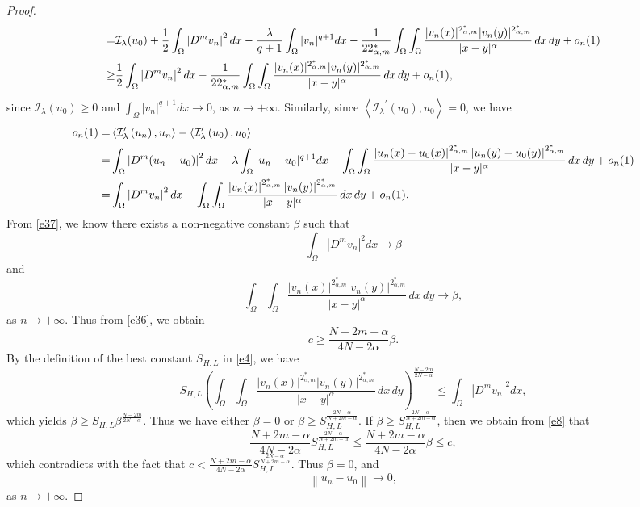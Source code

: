 \documentclass[reqno]{amsart}
\newcommand{\la} {\lambda}
\newcommand{\Om}{\Omega}
\newcommand{\al} {\alpha}
\newcommand{\mc} {\mathcal}
\numberwithin{theorem}{section} \numberwithin{equation}{section}
\begin{document}
\begin{proof}
\begin{align}
= & \mc{I}_\la(u_0)+\frac{1}{2} \int_{\Om}\left|D^m v_n\right|^2 d x-\frac{\la}{q+1} \int_{\Om} |v_n|^{q+1} d x-\frac{1}{22_{\al, m}^*} \int_{\Om} \int_{\Om} \frac{|v_n(x)|^{2_{\al, m}^*}|v_n(y)|^{2_{\al, m}^*}}{|x-y|^\al} \, dx \, dy+o_n(1)\notag \\
\geq & \frac{1}{2} \int_{\Om}\left|D^m v_n\right|^2 d x-\frac{1}{22_{\al, m}^*} \int_{\Om} \int_{\Om} \frac{|v_n(x)|^{2_{\al, m}^*}|v_n(y)|^{2_{\al, m}^*}}{|x-y|^\al} \, dx \, dy+o_n(1),
\end{align}
since $\mc{I_\la}(u_0) \geq 0$ and $\int_{\Om} |v_n|^{q+1} d x \rightarrow 0$, as $n \rightarrow + \infty$. Similarly, since $\left\langle \mc{I_\la}^{\prime}(u_0), u_0\right\rangle=0$,
we have
\begin{align}\label{e37}
o_n(1)= & \left\langle \mc{I}_\la^{\prime}\left(u_n\right), u_n\right\rangle -\left\langle \mc{I}_\la^{\prime}\left(u_0\right), u_0\right\rangle\notag\\
= &\int_{\Om}\left|D^m (u_n -u_0)\right|^2 d x-\la \int_{\Om} |u_n -u_0|^{q+1} d x-\int_{\Om} \int_{\Om} \frac{\left|u_n(x)-u_0(x)\right|^{2_{\al,m}^{*}}\left|u_n(y)-u_0(y)\right|^{2_{\al,m}^{*}}}{|x-y|^\al} \, dx \, dy+o_n(1)\notag \\
= & \int_{\Om}\left|D^m v_n\right|^2 d x-\int_{\Om} \int_{\Om} \frac{\left|v_n(x)\right|^{2_{\al,m}^{*}}\left|v_n(y)\right|^{2_{\al,m}^{*}}}{|x-y|^\al} \, dx \, dy+o_n(1).
\end{align}
From \eqref{e37}, we know there exists a non-negative constant ${\beta}$ such that
\[\int_{\Om}\left|D^m v_n\right|^2 d x \rightarrow {\beta}\]
and
\[\int_{\Om} \int_{\Om} \frac{\left|v_n(x)\right|^{2_{\al, m}^*}\left|v_n(y)\right|^{2_{\al, m}^*}}{|x-y|^\al} \, dx \, dy \rightarrow {\beta},\]
as $n \rightarrow+\infty$. Thus from \eqref{e36}, we obtain
\begin{equation}\label{e8}
c \geq \frac{N+2m-\al}{4N-2\al} {\beta}.
\end{equation}
By the definition of the best constant $S_{H, L}$ in \eqref{e4}, we have
\[S_{H, L}\left(\int_{\Om} \int_{\Om} \frac{\left|v_n(x)\right|^{2_{\al, m}^*}\left|v_n(y)\right|^{2_{\al, m}^{*}}}{|x-y|^\al} \, dx \, dy\right)^{\frac{N-2m}{2N-\al}} \leq \int_{\Om}\left|D^m v_n\right|^2 d x,\]
which yields ${\beta} \geq S_{H, L} {\beta}^{\frac{N-2m}{2N-\al}}$. Thus we have either ${\beta}=0$ or ${\beta} \geq S_{H, L}^{\frac{2N-\al}{N+2m-\al}}$. If ${\beta}\geq S_{H, L}^{\frac{2N-\al}{N+2m-\al}}$, then we obtain from \eqref{e8} that
\[\frac{N+2m-\al}{4N-2\al} S_{H, L}^{\frac{2N-\al}{N+2m-\al}} \leq \frac{N+2m-\al}{4N-2\al} {\beta} \leq c,\]
which contradicts with the fact that $c<\frac{N+2m-\al}{4 N-2 \al} S_{H, L}^{\frac{2N-\al}{N+2m-\al}}$. Thus $\beta=0$, and
\[\left\|u_n-u_0\right\| \rightarrow 0,\]
as $n \rightarrow+\infty$.
\end{proof}
\end{document}
